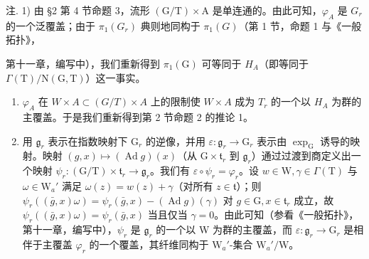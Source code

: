 注. 1) 由 §2 第 4 节命题 3，流形 \((\mathrm{G}/\mathrm{T}) \times \mathrm{A}\) 是单连通的。由此可知，\(\varphi_{A}\) 是 \(G_{r}\) 的一个泛覆盖；由于 \(\pi_{1}(G_{r})\) 典则地同构于 \(\pi_{1}(G)\)（第 1 节，命题 1 与《一般拓扑》，

第十一章，编写中），我们重新得到 \(\pi_{1}(\mathrm{G})\) 可等同于 \(H_{A}\)（即等同于 \(\Gamma(\mathrm{T})/\mathrm{N}(\mathrm{G},\mathrm{T})\)）这一事实。

\begin{enumerate}
\def\labelenumi{\arabic{enumi})}
\setcounter{enumi}{1}
\item
  \(\varphi_{A}\) 在 \(W \times A \subset (G/T) \times A\) 上的限制使 \(W \times A\) 成为 \(T_{r}\) 的一个以 \(H_{A}\) 为群的主覆盖。于是我们重新得到第 2 节命题 2 的推论 1。
\item
  用 \(\mathfrak{g}_r\) 表示在指数映射下 \(\mathrm{G}_r\) 的逆像，并用 \(\varepsilon : \mathfrak{g}_r \to \mathrm{G}_r\) 表示由 \(\exp_{\mathrm{G}}\) 诱导的映射。映射 \((g, x) \mapsto (\operatorname{Ad} g)(x)\)（从 \(\mathrm{G} \times \mathfrak{t}_r\) 到 \(\mathfrak{g}_r\)）通过过渡到商定义出一个映射 \(\psi_r : (\mathrm{G} / \mathrm{T}) \times \mathfrak{t}_r \to \mathfrak{g}_r\)。我们有 \(\varepsilon \circ \psi_r = \varphi_r\)。设 \(w \in \mathrm{W}, \gamma \in \Gamma(\mathrm{T})\) 与 \(\omega \in \mathrm{W}_a'\) 满足 \(\omega(z) = w(z) + \gamma\)（对所有 \(z \in \mathfrak{t}\)）；则 \(\psi_r((\bar{g}, x)\omega) = \psi_r(\bar{g}, x) - (\operatorname{Ad} g)(\gamma)\) 对 \(g \in \mathrm{G}, x \in \mathfrak{t}_r\) 成立，故 \(\psi_r((\bar{g}, x)\omega) = \psi_r(\bar{g}, x)\) 当且仅当 \(\gamma = 0\)。由此可知（参看《一般拓扑》，第十一章，编写中），\(\psi_r\) 是 \(\mathfrak{g}_r\) 的一个以 W 为群的主覆盖，而 \(\varepsilon : \mathfrak{g}_r \to \mathrm{G}_r\) 是相伴于主覆盖 \(\varphi_r\) 的一个覆盖，其纤维同构于 \(\mathrm{W}_a'\)-集合 \(\mathrm{W}_a'/\mathrm{W}\)。
\end{enumerate}

